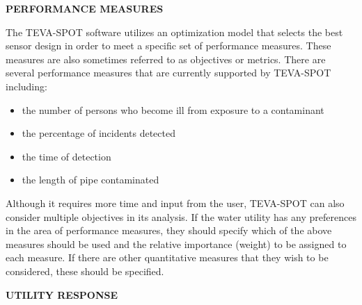 {\bf PERFORMANCE MEASURES}

The TEVA-SPOT software utilizes an optimization model that selects the best sensor design in order to meet a specific set of performance measures. These measures are also sometimes referred to as objectives or metrics. There are several performance measures that are currently supported by TEVA-SPOT including:  
\begin{itemize} 
\item the number of persons who become ill from exposure to a contaminant
\item the percentage of incidents detected
\item the time of detection
\item the length of pipe contaminated 
\end{itemize} 
Although it requires more time and input from the user, TEVA-SPOT can also consider multiple objectives in its analysis. If the water utility has any preferences in the area of performance measures, they should specify which of the above measures should be used and the relative importance (weight) to be assigned to each measure. If there are other quantitative measures that they wish to be considered, these should be specified.

{\bf UTILITY RESPONSE}

